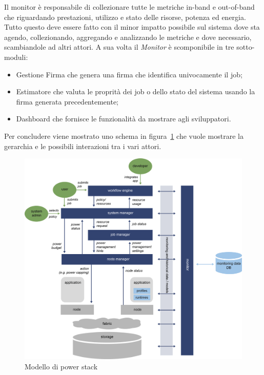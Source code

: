 Il monitor è responsabile di collezionare tutte le metriche in-band e out-of-band che riguardando prestazioni, utilizzo e stato delle risorse, potenza ed energia.
Tutto questo deve essere fatto con il minor impatto possibile sul sistema dove sta agendo, collezionando, aggregando e analizzando le metriche e dove necessario, scambiandole ad altri attori. A sua volta il \emph{Monitor} è scomponibile in tre sotto-moduli:
\begin{itemize}
    \item Gestione Firma che genera una firma che identifica univocamente il job; 
    \item Estimatore che valuta le proprità dei job o dello stato del sistema usando la firma generata precedentemente;
    \item Dashboard che fornisce le funzionalità da mostrare agli sviluppatori.
\end{itemize}


Per concludere viene mostrato uno schema in figura~\ref{fig:powerstackscheme} che vuole mostrare la gerarchia e le possibili interazioni tra i vari attori.
\begin{figure}[H]
    \centering
    \includegraphics[width=\textwidth]{img/REGALE-Architecture-1536x1421.png}
    \caption{Modello di power stack} 
    \label{fig:powerstackscheme}
\end{figure}

